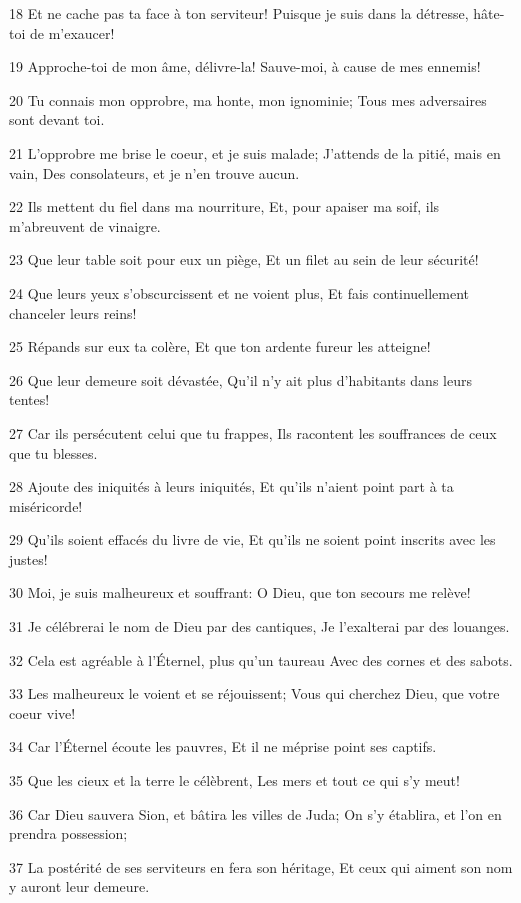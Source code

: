 \par 18 Et ne cache pas ta face à ton serviteur! Puisque je suis dans la détresse, hâte-toi de m'exaucer!
\par 19 Approche-toi de mon âme, délivre-la! Sauve-moi, à cause de mes ennemis!
\par 20 Tu connais mon opprobre, ma honte, mon ignominie; Tous mes adversaires sont devant toi.
\par 21 L'opprobre me brise le coeur, et je suis malade; J'attends de la pitié, mais en vain, Des consolateurs, et je n'en trouve aucun.
\par 22 Ils mettent du fiel dans ma nourriture, Et, pour apaiser ma soif, ils m'abreuvent de vinaigre.
\par 23 Que leur table soit pour eux un piège, Et un filet au sein de leur sécurité!
\par 24 Que leurs yeux s'obscurcissent et ne voient plus, Et fais continuellement chanceler leurs reins!
\par 25 Répands sur eux ta colère, Et que ton ardente fureur les atteigne!
\par 26 Que leur demeure soit dévastée, Qu'il n'y ait plus d'habitants dans leurs tentes!
\par 27 Car ils persécutent celui que tu frappes, Ils racontent les souffrances de ceux que tu blesses.
\par 28 Ajoute des iniquités à leurs iniquités, Et qu'ils n'aient point part à ta miséricorde!
\par 29 Qu'ils soient effacés du livre de vie, Et qu'ils ne soient point inscrits avec les justes!
\par 30 Moi, je suis malheureux et souffrant: O Dieu, que ton secours me relève!
\par 31 Je célébrerai le nom de Dieu par des cantiques, Je l'exalterai par des louanges.
\par 32 Cela est agréable à l'Éternel, plus qu'un taureau Avec des cornes et des sabots.
\par 33 Les malheureux le voient et se réjouissent; Vous qui cherchez Dieu, que votre coeur vive!
\par 34 Car l'Éternel écoute les pauvres, Et il ne méprise point ses captifs.
\par 35 Que les cieux et la terre le célèbrent, Les mers et tout ce qui s'y meut!
\par 36 Car Dieu sauvera Sion, et bâtira les villes de Juda; On s'y établira, et l'on en prendra possession;
\par 37 La postérité de ses serviteurs en fera son héritage, Et ceux qui aiment son nom y auront leur demeure.

